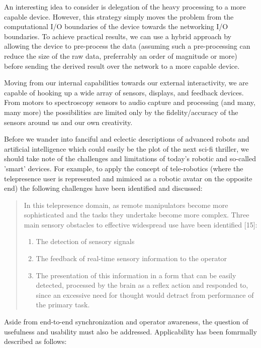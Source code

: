 \documentclass[final,a4paper,12pt]{report}
\begin{document}
An interesting idea to consider is delegation of the heavy processing to a more capable device. However, this strategy simply moves the problem from the computational I/O boundaries of the device towards the networking I/O boundaries. To achieve practical results, we can use a hybrid approach by allowing the device to pre-process the data (assuming such a pre-processing can reduce the size of the raw data, preferrably an order of magnitude or more) before sending the derived result over the network to a more capable device.

Moving from our internal capabilities towards our external interactivity, we are capable of hooking up a wide array of sensors, displays, and feedback devices. From motors to spectroscopy sensors to audio capture and processing (and many, many more) the possibilities are limited only by the fidelity/accuracy of the sensors around us and our own creativity.

Before we wander into fanciful and eclectic descriptions of advanced robots and artificial intelligence which could easily be the plot of the next sci-fi thriller, we should take note of the challenges and limitations of today's robotic and so-called 'smart' devices. For example, to apply the concept of tele-robotics (where the telepresence user is represented and mimiced as a robotic avatar on the opposite end) the following challenges have been identified and discussed:

\begin{quote}
In this telepresence domain, as remote manipulators become more sophisticated and the tasks they undertake become more complex. Three main sensory obstacles to effective widespread use have been identified [15]:
	\begin{enumerate}
		\item The detection of sensory signals
		\item The feedback of real-time sensory information to the operator
		\item The presentation of this information in a form that can be easily detected, processed by the brain as a reflex action and responded to, since an excessive need for thought would detract from performance of the primary task.
	\end{enumerate}
	\begin{flushright}
		\cite{540147}
	\end{flushright}
\end{quote}

Aside from end-to-end synchronization and operator awareness, the question of usefulness and usability must also be addressed. Applicability has been fomrmally described as follows:
\end{document}
